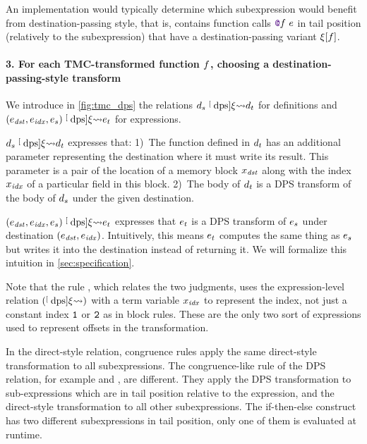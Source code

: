 An implementation would typically determine which subexpression would benefit from destination-passing style, that is, contains function calls $\datalangCall {\datalangFnptr \datalangFn} \datalangExpr$ in tail position (relatively to the subexpression) that have a destination-passing variant $\datalangRenaming [\datalangFn]$.


\paragraph{3. For each TMC-transformed function $\datalangFn$, choosing a destination-passing-style transform}
We introduce in \cref{fig:tmc_dps} the relations $\datalangDef_s \tmcDps{\datalangRenaming} \datalangDef_t$ for definitions and $(\datalangExpr_\mathit{dst}, \datalangExpr_\mathit{idx}, \datalangExpr_s) \tmcDps{\datalangRenaming} \datalangExpr_t$ for expressions.

$\datalangDef_s \tmcDps{\datalangRenaming} \datalangDef_t$ expresses that:
1)~The function defined in $\datalangDef_t$ has an additional parameter representing the destination where it must write its result. This parameter is a pair of the location of a memory block $\datalangVar_\mathit{dst}$ along with the index $\datalangVar_\mathit{idx}$ of a particular field in this block.
2)~The body of $\datalangDef_t$ is a DPS transform of the body of $\datalangDef_s$ under the given destination.

$(\datalangExpr_\mathit{dst}, \datalangExpr_\mathit{idx}, \datalangExpr_s) \tmcDps{\datalangRenaming} \datalangExpr_t$ expresses that $\datalangExpr_t$ is a DPS transform of $\datalangExpr_s$ under destination $(\datalangExpr_\mathit{dst}, \datalangExpr_\mathit{idx})$.
Intuitively, this means $\datalangExpr_t$ computes the same thing as $\datalangExpr_s$ but writes it into the destination instead of returning it.
We will formalize this intuition in \cref{sec:specification}.

Note that the rule , which relates the two judgments, uses the expression-level relation $(\mathrel{\stackrel[\scriptscriptstyle\textrm{dps}]{ \xi }{ \rightsquigarrow }})$ with a term variable $\datalangVar_\mathit{idx}$ to represent the index, not just a constant index $\texttt{1}$ or $\texttt{2}$ as in block rules. These are the only two sort of expressions used to represent offsets in the transformation.

In the direct-style relation, congruence rules apply the same direct-style transformation to all subexpressions. The congruence-like rule of the DPS relation, for example  and , are different. They apply the DPS transformation to sub-expressions which are in tail position relative to the expression, and the direct-style transformation to all other subexpressions. The if-then-else construct has two different subexpressions in tail position, only one of them is evaluated at runtime.

